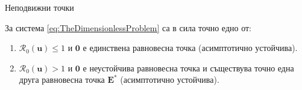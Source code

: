 \begin{frame}[t]{Неподвижни точки}
  \begin{proposition}
    За система \ref{eq:TheDimensionlessProblem} са в сила точно едно от:
    \begin{enumerate}
      \item $\mathscr{R}_0(\boldsymbol{u}) \leq 1$ и $\boldsymbol{0}$ е единствена равновесна точка (асимптотично устойчива).
      \item  $\mathscr{R}_0(\boldsymbol{u}) > 1$ и $\boldsymbol{0}$ е неустойчива равновесна точка и съществува точно една друга равновесна точка $\boldsymbol{E}^*$ (асимптотично устойчива).
    \end{enumerate}
  \end{proposition}
\end{frame}
